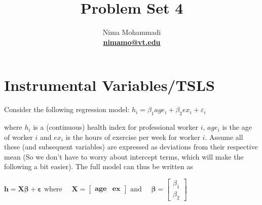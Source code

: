 \documentclass[11pt,reqno]{amsart}\usepackage[]{graphicx}\usepackage[]{color}
\newcommand{\mlt}[1]{\mathbf{#1}} %
\newenvironment{nouppercase}{%
  \let\uppercase\relax%
  \renewcommand{\uppercasenonmath}[1]{}}{}
\begin{document}

\title{Problem Set 4}
\author{Nima Mohammadi \\ \href{mailto:nimamo@vt.edu}{\textbf{nimamo@vt.edu}}} %
\begin{nouppercase}
\maketitle %
\end{nouppercase}










\section{Instrumental Variables/TSLS}

Consider the following regression model: $h_{i}=\beta_{1} a g e_{i}+\beta_{2} e x_{i}+\varepsilon_{i}$ 

where $h_{i}$ is a (continuous) health index for professional worker $i$, $age_{i}$ is the age of worker $i$ and $ex_i$ is the hours of exercise per week for worker $i$. Assume all these (and subsequent variables) are expressed as deviations from their respective mean (So we don't have to worry about intercept terms, which will make the following a bit easier).  The full model can thus be written as 

$\mlt{h}=\mlt{X} \boldsymbol{\beta}+\boldsymbol{\varepsilon} \text { where } \quad \mlt{X}=\left[\begin{array}{lll}
\mlt{age} & \mlt{ex}
\end{array}\right] \text { and } \quad \boldsymbol{\beta}=\left[\begin{array}{l}
\beta_{1} \\
\beta_{2}
\end{array}\right]$
\end{document}
